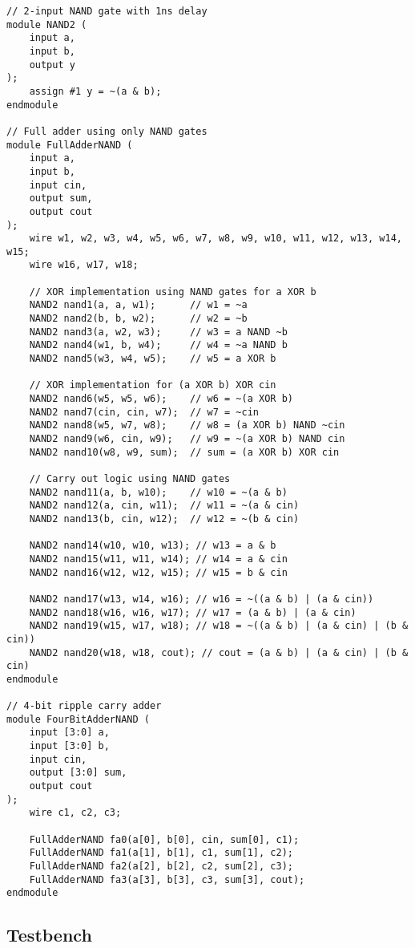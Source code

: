 \documentclass{article}
\begin{document}
\begin{lstlisting}
// 2-input NAND gate with 1ns delay
module NAND2 (
    input a,
    input b,
    output y
);
    assign #1 y = ~(a & b);
endmodule

// Full adder using only NAND gates
module FullAdderNAND (
    input a,
    input b,
    input cin,
    output sum,
    output cout
);
    wire w1, w2, w3, w4, w5, w6, w7, w8, w9, w10, w11, w12, w13, w14, w15;
    wire w16, w17, w18;
    
    // XOR implementation using NAND gates for a XOR b
    NAND2 nand1(a, a, w1);      // w1 = ~a
    NAND2 nand2(b, b, w2);      // w2 = ~b
    NAND2 nand3(a, w2, w3);     // w3 = a NAND ~b
    NAND2 nand4(w1, b, w4);     // w4 = ~a NAND b
    NAND2 nand5(w3, w4, w5);    // w5 = a XOR b
    
    // XOR implementation for (a XOR b) XOR cin
    NAND2 nand6(w5, w5, w6);    // w6 = ~(a XOR b)
    NAND2 nand7(cin, cin, w7);  // w7 = ~cin
    NAND2 nand8(w5, w7, w8);    // w8 = (a XOR b) NAND ~cin
    NAND2 nand9(w6, cin, w9);   // w9 = ~(a XOR b) NAND cin
    NAND2 nand10(w8, w9, sum);  // sum = (a XOR b) XOR cin
    
    // Carry out logic using NAND gates
    NAND2 nand11(a, b, w10);    // w10 = ~(a & b)
    NAND2 nand12(a, cin, w11);  // w11 = ~(a & cin)
    NAND2 nand13(b, cin, w12);  // w12 = ~(b & cin)
    
    NAND2 nand14(w10, w10, w13); // w13 = a & b
    NAND2 nand15(w11, w11, w14); // w14 = a & cin
    NAND2 nand16(w12, w12, w15); // w15 = b & cin
    
    NAND2 nand17(w13, w14, w16); // w16 = ~((a & b) | (a & cin))
    NAND2 nand18(w16, w16, w17); // w17 = (a & b) | (a & cin)
    NAND2 nand19(w15, w17, w18); // w18 = ~((a & b) | (a & cin) | (b & cin))
    NAND2 nand20(w18, w18, cout); // cout = (a & b) | (a & cin) | (b & cin)
endmodule

// 4-bit ripple carry adder
module FourBitAdderNAND (
    input [3:0] a,
    input [3:0] b,
    input cin,
    output [3:0] sum,
    output cout
);
    wire c1, c2, c3;
    
    FullAdderNAND fa0(a[0], b[0], cin, sum[0], c1);
    FullAdderNAND fa1(a[1], b[1], c1, sum[1], c2);
    FullAdderNAND fa2(a[2], b[2], c2, sum[2], c3);
    FullAdderNAND fa3(a[3], b[3], c3, sum[3], cout);
endmodule
\end{lstlisting}

\subsection{Testbench}
\end{document}
